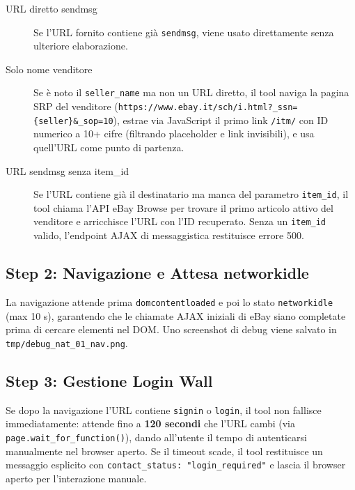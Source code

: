 \begin{description}
    \item[URL diretto sendmsg] Se l'URL fornito contiene già
        \texttt{sendmsg}, viene usato direttamente senza ulteriore
        elaborazione.

    \item[Solo nome venditore] Se è noto il \texttt{seller\_name} ma
        non un URL diretto, il tool naviga la pagina SRP del venditore
        (\texttt{https://www.ebay.it/sch/i.html?\_ssn=\{seller\}\&\_sop=10}),
        estrae via JavaScript il primo link \texttt{/itm/} con ID
        numerico a 10+ cifre (filtrando placeholder e link invisibili),
        e usa quell'URL come punto di partenza.

    \item[URL sendmsg senza item\_id] Se l'URL contiene già il
        destinatario ma manca del parametro \texttt{item\_id}, il tool
        chiama l'API eBay Browse per trovare il primo articolo attivo
        del venditore e arricchisce l'URL con l'ID recuperato. Senza
        un \texttt{item\_id} valido, l'endpoint AJAX di messaggistica
        restituisce errore 500.
\end{description}

\subsection{Step 2: Navigazione e Attesa networkidle}
\label{subsec:pw-contact-nav}

La navigazione attende prima \texttt{domcontentloaded} e poi lo stato
\texttt{networkidle} (max 10 s), garantendo che le chiamate AJAX
iniziali di eBay siano completate prima di cercare elementi nel DOM.
Uno screenshot di debug viene salvato in \texttt{tmp/debug\_nat\_01\_nav.png}.

\subsection{Step 3: Gestione Login Wall}
\label{subsec:pw-contact-login}

Se dopo la navigazione l'URL contiene \texttt{signin} o \texttt{login},
il tool non fallisce immediatamente: attende fino a \textbf{120 secondi}
che l'URL cambi (via \texttt{page.wait\_for\_function()}), dando
all'utente il tempo di autenticarsi manualmente nel browser aperto.
Se il timeout scade, il tool restituisce un messaggio esplicito
con \texttt{contact\_status: "login\_required"} e lascia il browser
aperto per l'interazione manuale.

